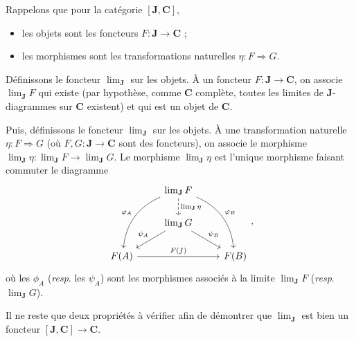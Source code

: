 \documentclass{../../td}
\begin{document}
  Rappelons que pour la catégorie $[\mathbf{J},\mathbf{C}]$,
  \begin{itemize}
    \item les objets sont les foncteurs $F : \mathbf{J} \to \mathbf{C}$ ;
    \item les morphismes sont les transformations naturelles $\eta : F \Rightarrow G$. 
  \end{itemize}

  Définissons le foncteur $\lim_\mathbf{J}$ sur les objets.
  À un foncteur $F : \mathbf{J} \to \mathbf{C}$, on associe $\lim_\mathbf{J} F$ qui existe (par hypothèse, comme $\mathbf{C}$ complète, toutes les limites de $\mathbf{J}$-diagrammes sur $\mathbf{C}$ existent) et qui est un objet de $\mathbf{C}$.

  Puis, définissons le foncteur $\lim_\mathbf{J}$ sur les objets.
  À une transformation naturelle $\eta : F \Rightarrow G$ (où $F, G : \mathbf{J} \to \mathbf{C}$ sont des foncteurs), on associe le morphisme $\lim_\mathbf{J} \eta : \lim_\mathbf{J} F \to \lim_\mathbf{J} G$.
  Le morphisme $\lim_\mathbf{J} \eta$ est l'unique morphisme faisant commuter le diagramme 
  \[
  \begin{tikzcd}
      & \lim_\mathbf{J} F \arrow[dashed]{d}{\lim_\mathbf{J} \eta} \arrow[bend right,swap]{ddl}{\varphi_A} \arrow[bend left]{ddr}{\varphi_B}\\
      & \lim_\mathbf{J} G \arrow[swap]{dl}{\psi_A} \arrow{dr}{\psi_B}\\
      F(A) \arrow{rr}{F(f)} & & F(B)
  \end{tikzcd}
  ,\] 
  où les $\phi_A$ (\textit{resp}. les $\psi_A$) sont les morphismes associés à la limite $\lim_\mathbf{J} F$ (\textit{resp}. $\lim_\mathbf{J} G$).

  Il ne reste que deux propriétés à vérifier afin de démontrer que $\lim_\mathbf{J}$ est bien un foncteur $[\mathbf{J}, \mathbf{C}] \to \mathbf{C}$.
\end{document}
